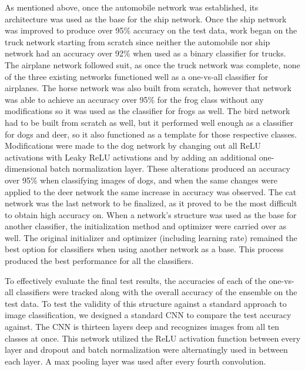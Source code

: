 \documentclass[10pt,twocolumn,letterpaper]{article}
\begin{document}
As mentioned above, once the automobile network was established, its architecture was used as the base for the ship network. Once the ship network was improved to produce over 95\% accuracy on the test data, work began on the truck network starting from scratch since neither the automobile nor ship network had an accuracy over 92\% when used as a binary classifier for trucks. The airplane network followed suit, as once the truck network was complete, none of the three existing networks functioned well as a one-vs-all classifier for airplanes. The horse network was also built from scratch, however that network was able to achieve an accuracy over 95\% for the frog class without any modifications so it was used as the classifier for frogs as well. The bird network had to be built from scratch as well, but it performed well enough as a classifier for dogs and deer, so it also functioned as a template for those respective classes. Modifications were made to the dog network by changing out all ReLU activations with Leaky ReLU activations and by adding an additional one-dimensional batch normalization layer. These alterations produced an accuracy over 95\% when classifying images of dogs, and when the same changes were applied to the deer network the same increase in accuracy was observed. The cat network was the last network to be finalized, as it proved to be the most difficult to obtain high accuracy on. When a network’s structure was used as the base for another classifier, the initialization method and optimizer were carried over as well. The original initializer and optimizer (including learning rate) remained the best option for classifiers when using another network as a base. This process produced the best performance for all the classifiers.

To effectively evaluate the final test results, the accuracies of each of the one-vs-all classifiers were tracked along with the overall accuracy of the ensemble on the test data. To test the validity of this structure against a standard approach to image classification, we designed a standard CNN to compare the test accuracy against. The CNN is thirteen layers deep and recognizes images from all ten classes at once. This network utilized the ReLU activation function between every layer and dropout and batch normalization were alternatingly used in between each layer. A max pooling layer was used after every fourth convolution.
\end{document}
